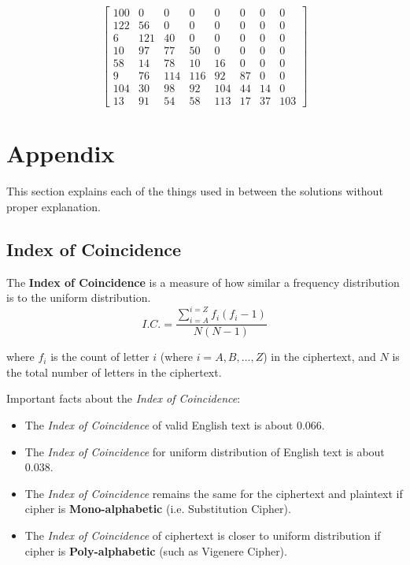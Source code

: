 \documentclass[10pt,twoside]{article}
\begin{document}
 $$\begin{bmatrix}
 100& 0& 0& 0& 0& 0& 0& 0\\
 122&56& 0& 0& 0& 0& 0& 0\\
 6 &121&40& 0& 0& 0& 0& 0\\
  10&97&77&50& 0& 0& 0& 0\\
  58&14&78&10&16& 0& 0& 0\\
 9&76 &114 &116&92&87& 0& 0\\
 104&30&98&92 &104&44&14& 0\\
  13&91&54&58 &113&17&37 &103
  \end{bmatrix}$$


\newpage
\section{Appendix}

This section explains each of the things used in between the solutions without proper explanation.

\subsection{Index of Coincidence} \label{ic}

The \textbf{Index of Coincidence} is a measure of how similar a frequency distribution is to the uniform distribution.
$$ I.C. = \frac{\sum_{i=A}^{i=Z} f_i(f_i-1)}{N(N-1)}$$

where $f_i$ is the count of letter $i$ (where $i = A,B,...,Z$) in the ciphertext, and $N$ is the total number of letters in the ciphertext. \newline

Important facts about the \textit{Index of Coincidence}:
\begin{itemize}
  \setlength\itemsep{0em}
    \item The \textit{Index of Coincidence} of valid English text is about $0.066$.
    \item The \textit{Index of Coincidence} for uniform distribution of English text is about $0.038$.
    \item The \textit{Index of Coincidence} remains the same for the ciphertext and plaintext if cipher is \textbf{Mono-alphabetic} (i.e. Substitution Cipher).
    \item The \textit{Index of Coincidence} of ciphertext is closer to uniform distribution if cipher is \textbf{Poly-alphabetic} (such as Vigenere Cipher).
\end{itemize}
\end{document}
